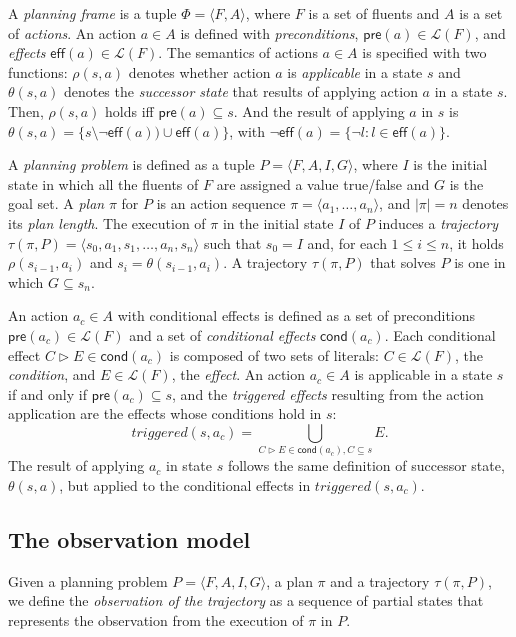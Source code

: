 \documentclass[runningheads]{llncs}
\newcommand{\tup}[1]{{\langle #1 \rangle}}
\newcommand{\pre}{\mathsf{pre}}     %
\newcommand{\eff}{\mathsf{eff}}     %
\newcommand{\cond}{\mathsf{cond}}   %
\begin{document}
A {\em planning frame} is a tuple $\Phi=\tup{F,A}$, where $F$ is a set of fluents and $A$ is a set of \emph{actions}. An action $a\in A$ is defined with {\em preconditions}, $\pre(a)\in\mathcal{L}(F)$,  and {\em effects} $\eff(a)\in\mathcal{L}(F)$. The semantics of actions $a\in A$ is specified with two functions: $\rho(s,a)$ denotes whether action $a$ is {\em applicable} in a state $s$ and $\theta(s,a)$ denotes the {\em successor state} that results of applying action $a$ in a state $s$. Then, $\rho(s,a)$ holds iff $\pre(a)\subseteq s$. And the result of applying $a$ in $s$ is $\theta(s,a)=\{s\setminus\neg\eff(a))\cup\eff(a)\}$, with $\neg\eff(a) = \{\neg l : l \in \eff(a)\}$.

A {\em planning problem} is defined as a tuple $P=\tup{F,A,I,G}$, where $I$ is the initial state in which all the fluents of $F$ are assigned a value true/false and $G$ is the goal set. A {\em plan} $\pi$ for $P$ is an action sequence $\pi=\tup{a_1, \ldots, a_n}$, and $|\pi|=n$ denotes its {\em plan length}. The execution of $\pi$ in the initial state $I$ of $P$ induces a {\em trajectory} $\tau(\pi,P)=\tup{s_0, a_1, s_1, \ldots, a_n, s_n}$ such that $s_0=I$ and, for each {\small $1\leq i\leq n$}, it holds $\rho(s_{i-1},a_i)$ and $s_i=\theta(s_{i-1},a_i)$. A trajectory $\tau(\pi,P)$ that solves $P$ is one in which $G \subseteq s_n$.

An action $a_c\in A$ with conditional effects is defined as a set of preconditions $\pre(a_c)\in\mathcal{L}(F)$ and a set of {\em conditional effects} $\cond(a_c)$. Each conditional effect $C\rhd E\in\cond(a_c)$ is composed of two sets of literals: $C\in\mathcal{L}(F)$, the {\em condition}, and $E\in\mathcal{L}(F)$, the {\em effect}. An action $a_c\in A$ is applicable in a state $s$ if and only if $\pre(a_c)\subseteq s$, and the {\em triggered effects} resulting from the action application are the effects whose conditions hold in $s$:
\[
triggered(s,a_c)=\bigcup\limits_{C\rhd E\in\cond(a_c),C\subseteq s} E. 
\]
The result of applying $a_c$ in state $s$ follows the same definition of successor state, $\theta(s,a)$, but applied to the conditional effects in $triggered(s,a_c)$.

\subsection{The observation model}
Given a planning problem $P=\tup{F,A,I,G}$, a plan $\pi$ and a trajectory $\tau(\pi,P)$, we define the \emph{observation of the trajectory} as a sequence of partial states that represents the observation from the execution of $\pi$ in $P$.
\end{document}
